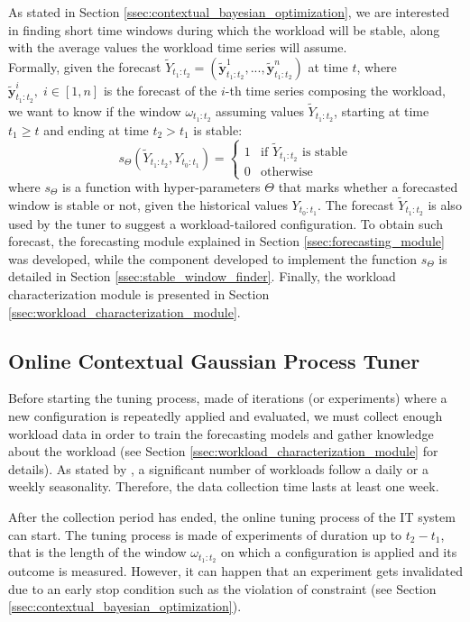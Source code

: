\documentclass[a4paper, 12pt]{article} %
\begin{document}
	As stated in Section \ref{ssec:contextual_bayesian_optimization}, we are interested in finding short time windows during which the workload will be stable, along with the average values the workload time series will assume. \\
	Formally, given the forecast $\tilde{Y}_{t_1:t_2} = (\tilde{\pmb{y}}_{t_1:t_2}^1, ..., \tilde{\pmb{y}}_{t_1:t_2}^n)$ at time $t$, where $\tilde{\pmb{y}}_{t_1:t_2}^i, \; i\in [1, n]$ is the forecast of the $i$-th time series composing the workload, we want to know if the window $\omega_{t_1:t_2}$ assuming values $\tilde{Y}_{t_1:t_2}$, starting at time $t_1 \geq t$ and ending at time $t_2 > t_1$ is stable: 
	\begin{equation}
		s_\Theta(\tilde{Y}_{t_1:t_2}, Y_{t_0:t_1}) = \begin{cases}
			1 & \text{if $\tilde{Y}_{t_1:t_2}$ is stable}\\
			0 & \text{otherwise}
		\end{cases}    
	\end{equation}
	where $s_\Theta$ is a function with hyper-parameters $\Theta$ that marks whether a forecasted window is stable or not, given the historical values $Y_{t_0:t_1}$. The forecast $\tilde{Y}_{t_1:t_2}$ is also used by the tuner to suggest a workload-tailored configuration.
	To obtain such forecast, the forecasting module explained in Section \ref{ssec:forecasting_module} was developed, while the component developed to implement the function $s_\Theta$ is detailed in Section \ref{ssec:stable_window_finder}. Finally, the workload characterization module is presented in Section \ref{ssec:workload_characterization_module}. 
	
	\subsection{Online Contextual Gaussian Process Tuner}
	Before starting the tuning process, made of iterations (or experiments) where a new configuration is repeatedly applied and evaluated, we must collect enough workload data in order to train the forecasting models and gather knowledge about the workload (see Section \ref{ssec:workload_characterization_module} for details).
	As stated by \cite{Seagull}, a significant number of workloads follow a daily or a weekly seasonality. Therefore, the data collection time lasts at least one week.
	 
	 After the collection period has ended, the online tuning process of the IT system can start. The tuning process is made of experiments of duration up to $t_2 - t_1$, that is the length of the window $\omega_{t_1:t_2}$ on which a configuration is applied and its outcome is measured.  However, it can happen that an experiment gets invalidated due to an early stop condition such as the violation of constraint (see Section \ref{ssec:contextual_bayesian_optimization}).  
	 
\end{document}
